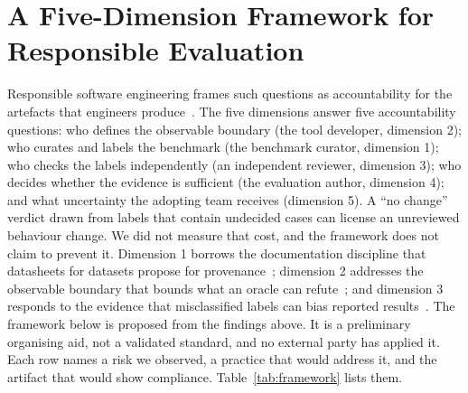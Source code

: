 \documentclass[conference]{IEEEtran}
\begin{document}
\section{A Five-Dimension Framework for Responsible Evaluation}
Responsible software engineering frames such questions as accountability for the artefacts that engineers produce~\cite{schieferdecker2019,zhang2025}. The five dimensions answer five accountability questions: who defines the observable boundary (the tool developer, dimension 2); who curates and labels the benchmark (the benchmark curator, dimension 1); who checks the labels independently (an independent reviewer, dimension 3); who decides whether the evidence is sufficient (the evaluation author, dimension 4); and what uncertainty the adopting team receives (dimension 5). A ``no change'' verdict drawn from labels that contain undecided cases can license an unreviewed behaviour change. We did not measure that cost, and the framework does not claim to prevent it. Dimension 1 borrows the documentation discipline that datasheets for datasets propose for provenance~\cite{gebru2021}; dimension 2 addresses the observable boundary that bounds what an oracle can refute~\cite{barr2015,papadakis2016}; and dimension 3 responds to the evidence that misclassified labels can bias reported results~\cite{herzig2013,northcutt2021}. The framework below is proposed from the findings above. It is a preliminary organising aid, not a validated standard, and no external party has applied it. Each row names a risk we observed, a practice that would address it, and the artifact that would show compliance. Table~\ref{tab:framework} lists them.
\end{document}
